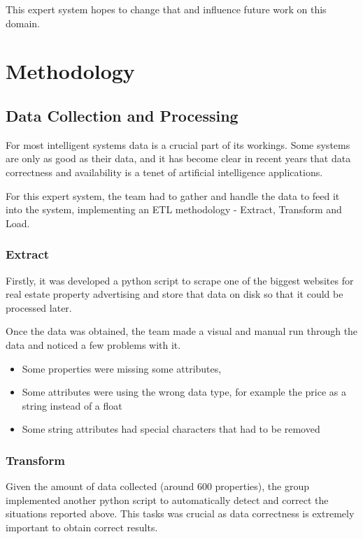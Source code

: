 \documentclass[runningheads]{llncs}
\begin{document}
This expert system hopes to change that and influence future work on this domain.

\section{Methodology}

\subsection{Data Collection and Processing}

For most intelligent systems data is a crucial part of its workings. Some systems are only as good as their data, and it has become clear in recent years that data correctness and availability is a tenet of artificial intelligence applications.

For this expert system, the team had to gather and handle the data to feed it into the system, implementing an ETL methodology - Extract, Transform and Load.

\subsubsection{Extract}
Firstly, it was developed a python script to scrape one of the biggest websites for real estate property advertising and store that data on disk so that it could be processed later.

Once the data was obtained, the team made a visual and manual run through the data and noticed a few problems with it.
\begin{itemize}
    \item Some properties were missing some attributes,
    \item Some attributes were using the wrong data type, for example the price as a string instead of a float
    \item Some string attributes had special characters that had to be removed
\end{itemize}

\subsubsection{Transform}
Given the amount of data collected (around 600 properties), the  group implemented another python script to automatically detect and correct the situations reported above. This tasks was crucial as data correctness is extremely important to obtain correct results.
\end{document}
